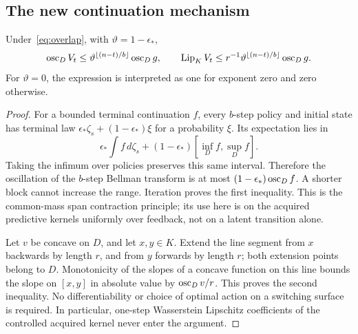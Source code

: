 \subsection{The new continuation mechanism}
\begin{lemma}\label{lem:span}
Under~\eqref{eq:overlap}, with $\vartheta=1-\epsilon_*$,
\begin{equation}\label{eq:span}
 \operatorname{osc}_D V_t\le \vartheta^{\lfloor(n-t)/b\rfloor}\operatorname{osc}_D g,
 \qquad
 \operatorname{Lip}_K V_t\le r^{-1}\vartheta^{\lfloor(n-t)/b\rfloor}\operatorname{osc}_D g.
\end{equation}
For $\vartheta=0$, the expression is interpreted as one for exponent zero and zero otherwise.
\end{lemma}
\begin{proof}
For a bounded terminal continuation $f$, every $b$-step policy and initial state has terminal law $\epsilon_*\zeta_s+(1-\epsilon_*)\xi$ for a probability $\xi$. Its expectation lies in
\[
 \epsilon_*\int f\,d\zeta_s+
           (1-\epsilon_*)[\inf_D f,\sup_D f].
\]
Taking the infimum over policies preserves this same interval. Therefore the oscillation of the $b$-step Bellman transform is at most $(1-\epsilon_*)\operatorname{osc}_D f$. A shorter block cannot increase the range. Iteration proves the first inequality. This is the common-mass span contraction principle; its use here is on the acquired predictive kernels uniformly over feedback, not on a latent transition alone.

Let $v$ be concave on $D$, and let $x,y\in K$. Extend the line segment from $x$ backwards by length $r$, and from $y$ forwards by length $r$; both extension points belong to $D$. Monotonicity of the slopes of a concave function on this line bounds the slope on $[x,y]$ in absolute value by $\operatorname{osc}_Dv/r$. This proves the second inequality. No differentiability or choice of optimal action on a switching surface is required. In particular, one-step Wasserstein Lipschitz coefficients of the controlled acquired kernel never enter the argument.
\end{proof}

